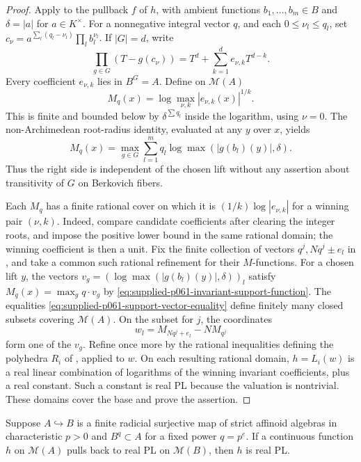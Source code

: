 \begin{proof}
Apply  to the pullback $f$ of $h$, with ambient functions $b_1,\ldots,b_m\in B$ and $\delta=|a|$ for $a\in K^\times$. For a nonnegative integral vector $q$, and each $0\leq\nu_l\leq q_l$, set $c_\nu=a^{\sum_l(q_l-\nu_l)}\prod_l b_l^{\nu_l}$. If $|G|=d$, write
\[
 \prod_{g\in G}(T-g(c_\nu))=T^d+\sum_{k=1}^d e_{\nu,k}T^{d-k}.
\]
Every coefficient $e_{\nu,k}$ lies in $B^G=A$. Define on $\mathcal M(A)$
\[
 M_q(x)=\log\max_{\nu,k}|e_{\nu,k}(x)|^{1/k}.
\]
This is finite and bounded below by $\delta^{\sum q_l}$ inside the logarithm, using $\nu=0$. The non-Archimedean root-radius identity, evaluated at any $y$ over $x$, yields
\begin{equation}\label{eq:supplied-p061-invariant-support-function}
 M_q(x)=\max_{g\in G}\sum_{l=1}^m q_l\log\max(|g(b_l)(y)|,\delta).
\end{equation}
Thus the right side is independent of the chosen lift without any assertion about transitivity of $G$ on Berkovich fibers.

Each $M_q$ has a finite rational cover on which it is $(1/k)\log|e_{\nu,k}|$ for a winning pair $(\nu,k)$. Indeed, compare candidate coefficients after clearing the integer roots, and impose the positive lower bound in the same rational domain; the winning coefficient is then a unit. Fix the finite collection of vectors $q^j,Nq^j\pm e_l$ in , and take a common such rational refinement for their $M$-functions. For a chosen lift $y$, the vectors $v_g=(\log\max(|g(b_l)(y)|,\delta))_l$ satisfy $M_q(x)=\max_g q\cdot v_g$ by \eqref{eq:supplied-p061-invariant-support-function}. The equalities \eqref{eq:supplied-p061-support-vector-equality} define finitely many closed subsets covering $\mathcal M(A)$. On the subset for $j$, the coordinates
\[
 w_l=M_{Nq^j+e_l}-NM_{q^j}
\]
form one of the $v_g$. Refine once more by the rational inequalities defining the polyhedra $R_i$ of , applied to $w$. On each resulting rational domain, $h=L_i(w)$ is a real linear combination of logarithms of the winning invariant coefficients, plus a real constant. Such a constant is real PL because the valuation is nontrivial. These domains cover the base and prove the assertion.
\end{proof}

\begin{lemma}\label{lem:supplied-p061-frobenius-descent}
Suppose $A\hookrightarrow B$ is a finite radicial surjective map of strict affinoid algebras in characteristic $p>0$ and $B^q\subset A$ for a fixed power $q=p^e$. If a continuous function $h$ on $\mathcal M(A)$ pulls back to real PL on $\mathcal M(B)$, then $h$ is real PL.
\end{lemma}

